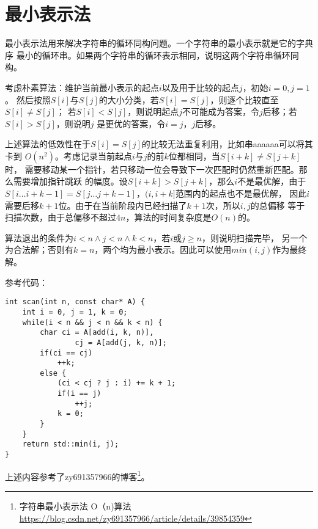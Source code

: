 \section{最小表示法}
最小表示法用来解决字符串的循环同构问题。一个字符串的最小表示就是它的字典序
最小的循环串。如果两个字符串的循环表示相同，说明这两个字符串循环同构。

考虑朴素算法：维护当前最小表示的起点$i$以及用于比较的起点$j$，初始$i=0,j=1$。
然后按照$S[i]$与$S[j]$的大小分类，若$S[i]=S[j]$，则逐个比较直至$S[i]\neq S[j]$；
若$S[i]<S[j]$，则说明起点$j$不可能成为答案，令$j$后移；若$S[i]>S[j]$，则说明$j$
是更优的答案，令$i=j$，$j$后移。

上述算法的低效性在于$S[i]=S[j]$的比较无法重复利用，比如串aaaaaa可以将其卡到
$O(n^2)$。考虑记录当前起点$i$与$j$的前$k$位都相同，当$S[i+k]\neq S[j+k]$时，
需要移动某一个指针，若只移动一位会导致下一次匹配时仍然重新匹配。那么需要增加指针跳跃
的幅度。设$S[i+k]>S[j+k]$，那么$i$不是最优解，由于
$S[i\ldots i+k-1]=S[j\ldots j+k-1]$，$(i,i+k]$范围内的起点也不是最优解，
因此$i$需要后移$k+1$位。由于在当前阶段内已经扫描了$k+1$次，所以$i,j$的总偏移
等于扫描次数，由于总偏移不超过$4n$，算法的时间复杂度是$O(n)$的。

算法退出的条件为$i<n \land j<n \land k<n$，若$i$或$j\geq n$，则说明扫描完毕，
另一个为合法解；否则有$k=n$，两个均为最小表示。因此可以使用$min(i,j)$作为最终解。

参考代码：
\begin{lstlisting}
int scan(int n, const char* A) {
    int i = 0, j = 1, k = 0;
    while(i < n && j < n && k < n) {
        char ci = A[add(i, k, n)],
                cj = A[add(j, k, n)];
        if(ci == cj)
            ++k;
        else {
            (ci < cj ? j : i) += k + 1;
            if(i == j)
                ++j;
            k = 0;
        }
    }
    return std::min(i, j);
}
\end{lstlisting}

上述内容参考了zy691357966的博客\footnote{
    字符串最小表示法 O（n)算法
    \url{https://blog.csdn.net/zy691357966/article/details/39854359}
}。
